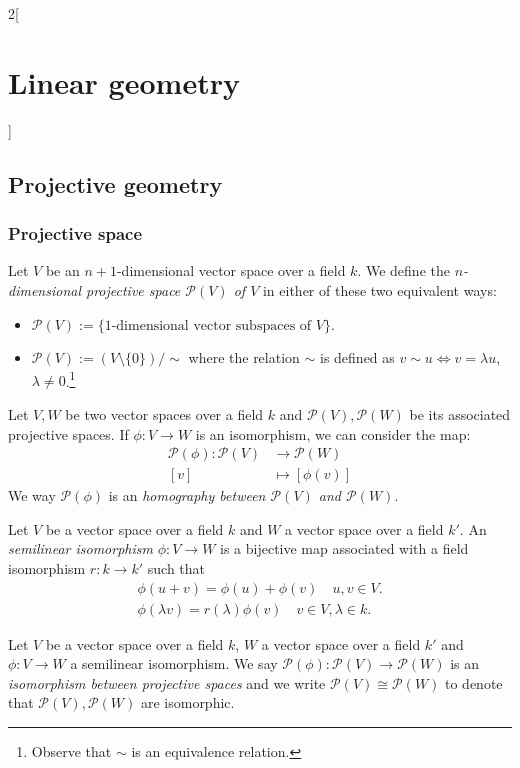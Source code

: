 \documentclass[class=article,10pt,crop=false]{standalone}
\begin{document}
\begin{multicols}{2}[\section{Linear geometry}]
\subsection{Projective geometry}
\subsubsection{Projective space}
\begin{definition}
Let $V$ be an $n+1$-dimensional vector space over a field $k$. We define the \textit{$n$-dimensional projective space $\mathcal{P}(V)$ of $V$} in either of these two equivalent ways:
\begin{itemize}
    \item $\displaystyle\mathcal{P}(V):=\{\text{1-dimensional vector subspaces of $V$}\}$.
    \item $\displaystyle\mathcal{P}(V):=(V\setminus\{0\})/\sim$ where the relation $\sim$ is defined as $v\sim u\iff v=\lambda u$, $\lambda\ne 0$.\footnote{Observe that $\sim$ is an equivalence relation.}
\end{itemize}
\end{definition}
\begin{definition}
Let $V,W$ be two vector spaces over a field $k$ and $\mathcal{P}(V),\mathcal{P}(W)$ be its associated projective spaces. If $\phi:V\rightarrow W$ is an isomorphism, we can consider the map:
\begin{align*}
    \mathcal{P}(\phi):\mathcal{P}(V)&\rightarrow\mathcal{P}(W)\\
    [v]&\mapsto [\phi(v)]
\end{align*}
We way $\mathcal{P}(\phi)$ is an \textit{homography between $\mathcal{P}(V)$ and $\mathcal{P}(W)$}.
\end{definition}
\begin{definition}
Let $V$ be a vector space over a field $k$ and $W$ a vector space over a field $k'$. An \textit{semilinear isomorphism} $\phi:V\rightarrow W$ is a bijective map associated with a field isomorphism $r:k\rightarrow k'$ such that
\begin{gather*}
    \phi(u+v)=\phi(u)+\phi(v)\quad u,v\in V.\\
    \phi(\lambda v)=r(\lambda)\phi(v)\quad v\in V,\lambda\in k.
\end{gather*}
\end{definition}
\begin{definition}
Let $V$ be a vector space over a field $k$, $W$ a vector space over a field $k'$ and $\phi:V\rightarrow W$ a semilinear isomorphism. We say $\mathcal{P}(\phi):\mathcal{P}(V)\rightarrow\mathcal{P}(W)$ is an \textit{isomorphism between projective spaces} and we write $\mathcal{P}(V)\cong \mathcal{P}(W)$ to denote that $\mathcal{P}(V),\mathcal{P}(W)$ are isomorphic.

\end{definition}
\end{multicols}
\end{document}
